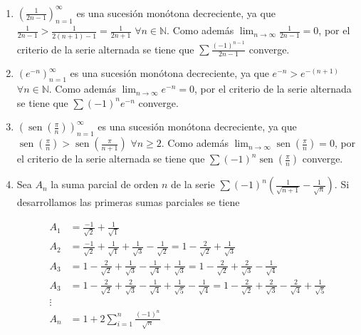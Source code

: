\documentclass[
  spanish,
  a4paper,
]{scrreport}
\theoremstyle{definition}
\theoremstyle{remark}
\begin{document}
\begin{tcolorbox}[enhanced jigsaw, arc=.35mm, bottomrule=.15mm, bottomtitle=1mm, breakable, colback=white, colbacktitle=quarto-callout-tip-color!10!white, colframe=quarto-callout-tip-color-frame, coltitle=black, left=2mm, leftrule=.75mm, opacityback=0, opacitybacktitle=0.6, rightrule=.15mm, title=\textcolor{quarto-callout-tip-color}{\faLightbulb}\hspace{0.5em}{Solución}, titlerule=0mm, toprule=.15mm, toptitle=1mm]

\begin{enumerate}
\def\labelenumi{\alph{enumi}.}
\item
  \(\left(\frac{1}{2n-1}\right)_{n=1}^\infty\) es una sucesión monótona
  decreciente, ya que
  \(\frac{1}{2n-1}>\frac{1}{2(n+1)-1}=\frac{1}{2n+1}\)
  \(\forall n\in\mathbb{N}\). Como además
  \(\lim_{n\to\infty} \frac{1}{2n-1} = 0\), por el criterio de la serie
  alternada se tiene que \(\sum \frac{(-1)^{n-1}}{2n-1}\) converge.
\item
  \((e^{-n})_{n=1}^\infty\) es una sucesión monótona decreciente, ya que
  \(e^{-n}>e^{-(n+1)}\) \(\forall n\in\mathbb{N}\). Como además
  \(\lim_{n\to\infty} e^{-n} = 0\), por el criterio de la serie
  alternada se tiene que \(\sum (-1)^ne^{-n}\) converge.
\item
  \(\left(\operatorname{sen}\left(\frac{\pi}{n}\right)\right)_{n=1}^\infty\)
  es una sucesión monótona decreciente, ya que
  \(\operatorname{sen}\left(\frac{\pi}{n}\right)>\operatorname{sen}\left(\frac{\pi}{n+1}\right)\)
  \(\forall n\geq 2\). Como además
  \(\lim_{n\to\infty} \operatorname{sen}\left(\frac{\pi}{n}\right) = 0\),
  por el criterio de la serie alternada se tiene que
  \(\sum (-1)^n\operatorname{sen}\left(\frac{\pi}{n}\right)\) converge.
\item
  Sea \(A_n\) la suma parcial de orden \(n\) de la serie
  \(\sum (-1)^n\left(\frac{1}{\sqrt{n+1}}-\frac{1}{\sqrt{n}}\right)\).
  Si desarrollamos las primeras sumas parciales se tiene

  \begin{align*}
   A_1 &= \frac{-1}{\sqrt{2}}+\frac{1}{\sqrt{1}}\\
   A_2 &= \frac{-1}{\sqrt{2}}+\frac{1}{\sqrt{1}} + \frac{1}{\sqrt{3}}-\frac{1}{\sqrt{2}} = 1 - \frac{2}{\sqrt{2}} + \frac{1}{\sqrt{3}}\\
   A_3 &= 1 - \frac{2}{\sqrt{2}} + \frac{1}{\sqrt{3}} -\frac{1}{\sqrt{4}} +\frac{1}{\sqrt{3}} =  1 - \frac{2}{\sqrt{2}} + \frac{2}{\sqrt{3}} -\frac{1}{\sqrt{4}} \\
   A_3 &= 1 - \frac{2}{\sqrt{2}} + \frac{2}{\sqrt{3}} -\frac{1}{\sqrt{4}} + \frac{1}{\sqrt{5}} -\frac{1}{\sqrt{4}} = 1 - \frac{2}{\sqrt{2}} + \frac{2}{\sqrt{3}} -\frac{2}{\sqrt{4}} + \frac{1}{\sqrt{5}}\\
   \vdots\\
   A_n &= 1 + 2\sum_{i=1}^n \frac{(-1)^n}{\sqrt{n}}
   \end{align*}


\end{enumerate}
\end{tcolorbox}
\end{document}
